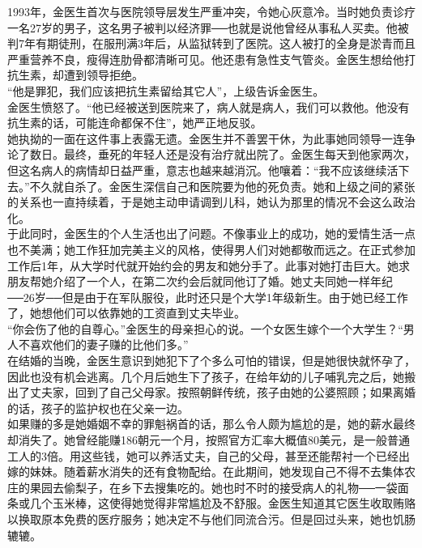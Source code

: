 1993年，金医生首次与医院领导层发生严重冲突，令她心灰意冷。当时她负责诊疗一名27岁的男子，这名男子被判以经济罪──也就是说他曾经从事私人买卖。他被判7年有期徒刑，在服刑满3年后，从监狱转到了医院。这人被打的全身是淤青而且严重营养不良，瘦得连肋骨都清晰可见。他还患有急性支气管炎。金医生想给他打抗生素，却遭到领导拒绝。\\

“他是罪犯，我们应该把抗生素留给其它人”，上级告诉金医生。\\

金医生愤怒了。“他已经被送到医院来了，病人就是病人，我们可以救他。他没有抗生素的话，可能连命都保不住”，她严正地反驳。\\

她执拗的一面在这件事上表露无遗。金医生并不善罢干休，为此事她同领导一连争论了数日。最终，垂死的年轻人还是没有治疗就出院了。金医生每天到他家两次，但这名病人的病情却日益严重，意志也越来越消沉。他嚷着：“我不应该继续活下去。”不久就自杀了。金医生深信自己和医院要为他的死负责。她和上级之间的紧张的关系也一直持续着，于是她主动申请调到儿科，她认为那里的情况不会这么政治化。\\

于此同时，金医生的个人生活也出了问题。不像事业上的成功，她的爱情生活一点也不美满；她工作狂加完美主义的风格，使得男人们对她都敬而远之。在正式参加工作后1年，从大学时代就开始约会的男友和她分手了。此事对她打击巨大。她求朋友帮她介绍了一个人，在第二次约会后就同他订了婚。她丈夫同她一样年纪──26岁──但是由于在军队服役，此时还只是个大学1年级新生。由于她已经工作了，她想他们可以依靠她的工资直到丈夫毕业。\\

“你会伤了他的自尊心。”金医生的母亲担心的说。一个女医生嫁个一个大学生？“男人不喜欢他们的妻子赚的比他们多。”\\

在结婚的当晚，金医生意识到她犯下了个多么可怕的错误，但是她很快就怀孕了，因此也没有机会逃离。几个月后她生下了孩子，在给年幼的儿子哺乳完之后，她搬出了丈夫家，回到了自己父母家。按照朝鲜传统，孩子由她的公婆照顾；如果离婚的话，孩子的监护权也在父亲一边。\\

如果赚的多是她婚姻不幸的罪魁祸首的话，那么令人颇为尴尬的是，她的薪水最终却消失了。她曾经能赚186朝元一个月，按照官方汇率大概值80美元，是一般普通工人的3倍。用这些钱，她可以养活丈夫，自己的父母，甚至还能帮衬一个已经出嫁的妹妹。随着薪水消失的还有食物配给。在此期间，她发现自己不得不去集体农庄的果园去偷梨子，在乡下去搜集吃的。她也时不时的接受病人的礼物──一袋面条或几个玉米棒，这使得她觉得非常尴尬及不舒服。金医生知道其它医生收取贿赂以换取原本免费的医疗服务；她决定不与他们同流合污。但是回过头来，她也饥肠辘辘。\\


